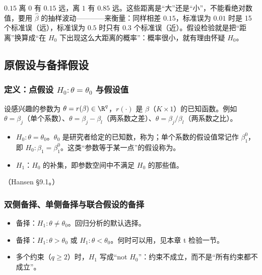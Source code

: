 $0.15$ 离 $0$ 有 $0.15$ 远，离 $1$ 有 $0.85$ 远。这些距离是“大”还是“小”，不能看绝对数值，要用 $\hat\beta$ 的抽样波动————来衡量：同样相差 $0.15$，标准误为 $0.01$ 时是 15 个标准误（远），标准误为 $0.5$ 时只有 0.3 个标准误（近）。假设检验就是把“距离”换算成“在 $H_0$ 下出现这么大距离的概率”：概率很小，就有理由怀疑 $H_0$。

\subsection{原假设与备择假设}

\subsubsection{定义：点假设 \texorpdfstring{$H_0:\theta=\theta_0$}{H0: theta = theta0} 与假设值}

设感兴趣的参数为 $\theta=r(\beta)\in\R^q$，$r(\cdot)$ 是 $\beta$（$K\times1$）的已知函数。例如 $\theta=\beta_j$（单个系数）、$\theta=\beta_j-\beta_l$（两系数之差）、$\theta=\beta_j/\beta_l$（两系数之比）。

\begin{defn}[原假设与备择假设]\label{def:U06a-hyp}
\begin{itemize}
  \item {} $H_0:\theta=\theta_0$。$\theta_0$ 是研究者给定的已知数，称为；单个系数的假设值常记作 $\beta_1^0$，即 $H_0:\beta_1=\beta_1^0$。这类“参数等于某一点”的假设称为。
  \item {} $H_1$：$H_0$ 的补集，即参数空间中不满足 $H_0$ 的那些值。
\end{itemize}
（Hansen §9.1。）
\end{defn}

\subsubsection{双侧备择、单侧备择与联合假设的备择}

\begin{itemize}
  \item {}备择：$H_1:\theta\ne\theta_0$。回归分析的默认选择。
  \item {}备择：$H_1:\theta>\theta_0$ 或 $H_1:\theta<\theta_0$。何时可以用，见本章 t 检验一节。
  \item 多个约束（$q\ge2$）时，$H_1$ 写成“not $H_0$”：约束不成立，而不是“所有约束都不成立”。
\end{itemize}

